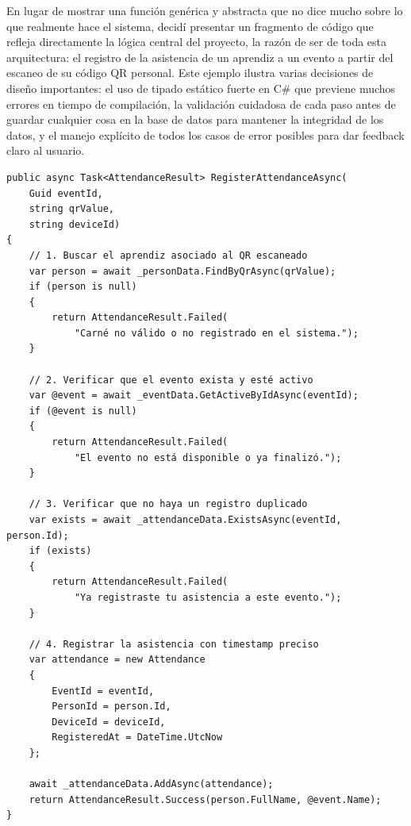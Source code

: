 En lugar de mostrar una función genérica y abstracta que no dice mucho sobre lo que realmente hace el sistema, decidí presentar un fragmento de código que refleja directamente la lógica central del proyecto, la razón de ser de toda esta arquitectura: el registro de la asistencia de un aprendiz a un evento a partir del escaneo de su código QR personal. Este ejemplo ilustra varias decisiones de diseño importantes: el uso de tipado estático fuerte en C\# que previene muchos errores en tiempo de compilación, la validación cuidadosa de cada paso antes de guardar cualquier cosa en la base de datos para mantener la integridad de los datos, y el manejo explícito de todos los casos de error posibles para dar feedback claro al usuario.

\ifminted
\begin{verbatim}
public async Task<AttendanceResult> RegisterAttendanceAsync(
    Guid eventId,
    string qrValue,
    string deviceId)
{
    // 1. Buscar el aprendiz asociado al QR escaneado
    var person = await _personData.FindByQrAsync(qrValue);
    if (person is null)
    {
        return AttendanceResult.Failed(
            "Carné no válido o no registrado en el sistema.");
    }

    // 2. Verificar que el evento exista y esté activo
    var @event = await _eventData.GetActiveByIdAsync(eventId);
    if (@event is null)
    {
        return AttendanceResult.Failed(
            "El evento no está disponible o ya finalizó.");
    }

    // 3. Verificar que no haya un registro duplicado
    var exists = await _attendanceData.ExistsAsync(eventId, person.Id);
    if (exists)
    {
        return AttendanceResult.Failed(
            "Ya registraste tu asistencia a este evento.");
    }

    // 4. Registrar la asistencia con timestamp preciso
    var attendance = new Attendance
    {
        EventId = eventId,
        PersonId = person.Id,
        DeviceId = deviceId,
        RegisteredAt = DateTime.UtcNow
    };

    await _attendanceData.AddAsync(attendance);
    return AttendanceResult.Success(person.FullName, @event.Name);
}
\end{verbatim}
\else
